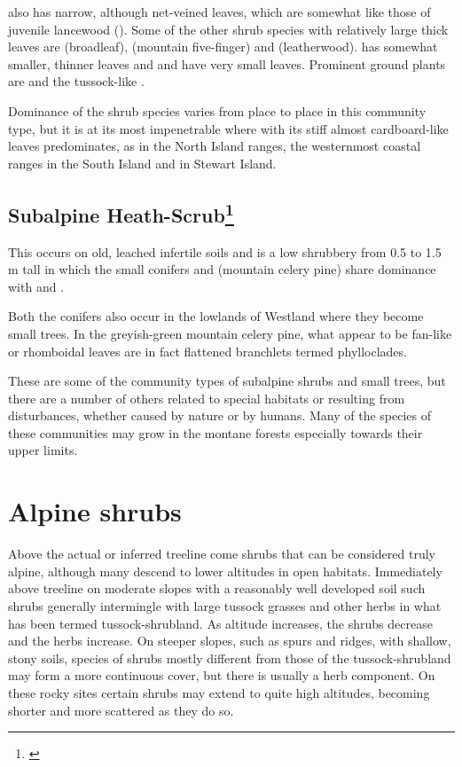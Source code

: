  also has narrow, although net-veined leaves, which are somewhat like those of juvenile lancewood ().
Some of the other shrub species with relatively large thick leaves are  (broadleaf),  (mountain five-finger) and  (leatherwood).  has somewhat smaller, thinner leaves and  and  have very small leaves.
Prominent ground plants are  and the tussock-like .

Dominance of the shrub species varies from place to place in this community type, but it is at its most impenetrable where  with its stiff almost cardboard-like leaves predominates, as in the North Island ranges, the westernmost coastal ranges in the South Island and in Stewart Island.

\subsection[Subalpine Heath-Scrub]{Subalpine Heath-Scrub\footnote{\cite{burrows1979heathlands}}}

This occurs on old, leached infertile soils and is a low shrubbery from 0.5 to 1.5 m tall in which the small conifers  and  (mountain celery pine) share dominance with  and .

Both the conifers also occur in the lowlands of Westland where they become small trees.
In the greyish-green mountain celery pine, what appear to be fan-like or rhomboidal leaves are in fact flattened branchlets termed phylloclades.

These are some of the community types of subalpine shrubs and small trees, but there are a number of others related to special habitats or resulting from disturbances, whether caused by nature or by humans.
Many of the species of these communities may grow in the montane forests especially towards their upper limits.

\section{Alpine shrubs}

Above the actual or inferred treeline come shrubs that can be considered truly alpine, although many descend to lower altitudes in open habitats.
Immediately above treeline on moderate slopes with a reasonably well developed soil such shrubs generally intermingle with large tussock grasses and other herbs in what has been termed tussock-shrubland.
As altitude increases, the shrubs decrease and the herbs increase.
On steeper slopes, such as spurs and ridges, with shallow, stony soils, species of shrubs mostly different from those of the tussock-shrubland may form a more continuous cover, but there is usually a herb component.
On these rocky sites certain shrubs may extend to quite high altitudes, becoming shorter and more scattered as they do so.

